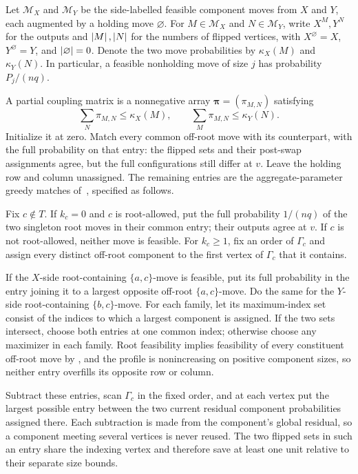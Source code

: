 \begin{definition}
\label{def:cv-component-matching}
Let \(\mathcal M_X\) and \(\mathcal M_Y\) be the side-labelled feasible
component moves from \(X\) and \(Y\), each augmented by a holding move
\(\varnothing\).  For \(M\in\mathcal M_X\) and
\(N\in\mathcal M_Y\), write \(X^M,Y^N\) for the outputs and
\(\left|M\right|,\left|N\right|\) for the numbers of flipped vertices, with
\(X^\varnothing=X\), \(Y^\varnothing=Y\), and
\(\left|\varnothing\right|=0\).  Denote the two move probabilities by
\(\kappa_X(M)\) and \(\kappa_Y(N)\).  In particular, a feasible
nonholding move of size \(j\) has probability \(P_j/(nq)\).

A partial coupling matrix is a nonnegative array
\(\boldsymbol\pi=(\pi_{M,N})\) satisfying
\[
  \sum_N\pi_{M,N}\le\kappa_X(M),
  \qquad
  \sum_M\pi_{M,N}\le\kappa_Y(N).
\]
Initialize it at zero.  Match every common off-root move with its
counterpart, with the full probability on that entry: the flipped sets
and their post-swap assignments agree, but the full configurations still
differ at \(v\).  Leave the holding row and column unassigned.  The remaining entries are the
aggregate-parameter greedy
matches of~\cite[\S5.1]{CarlsonVigoda2024}, specified as follows.

Fix \(c\notin T\).  If \(k_c=0\) and \(c\) is root-allowed, put the full
probability \(1/(nq)\) of the two singleton root moves in their common
entry; their outputs agree at \(v\).  If \(c\) is not root-allowed,
neither move is feasible.  For \(k_c\ge1\), fix an order of
\(\Gamma_c\) and assign every distinct off-root component to the first
vertex of \(\Gamma_c\) that it contains.

If the \(X\)-side root-containing \(\{a,c\}\)-move is feasible, put its
full probability in the entry joining it to a largest opposite off-root
\(\{a,c\}\)-move.  Do the same for the \(Y\)-side root-containing
\(\{b,c\}\)-move.  For each family, let its maximum-index set consist of
the indices to which a largest component is assigned.  If the two sets
intersect, choose both entries at one common index; otherwise choose any
maximizer in each family.  Root feasibility implies feasibility of every
constituent off-root move by , and the
profile is nonincreasing on positive component sizes, so neither entry
overfills its opposite row or
column.

Subtract these entries, scan \(\Gamma_c\) in the fixed order, and at each
vertex put the largest possible entry between the two current residual
component probabilities assigned there.  Each subtraction is made from the
component's global residual, so a component meeting several vertices is
never reused.  The two flipped sets in such an entry share the indexing
vertex and therefore save at least one unit relative to their separate size
bounds.


\end{definition}
